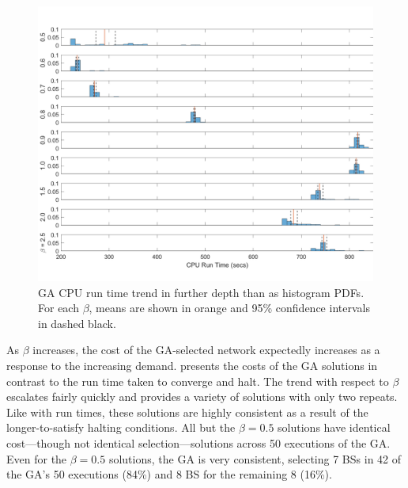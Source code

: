 \documentclass[12pt,dvipsnames]{report}
\begin{document}
\begin{figure}[p]
	\centering
	\includegraphics[angle=90,origin=c,height=0.8\textheight]{Figures/CaseI_GARunTime50_9HistogramsTall}
	\caption[Case I GA CPU run time histogram PDFs]{GA CPU run time trend in further depth than  as histogram PDFs.  For each $\beta$, means are shown in orange and 95\% confidence intervals in dashed black.}
	\label{fig:CaseI_GARunTimeHists}
\end{figure}

%
As $\beta$ increases, the cost of the GA-selected network expectedly increases as a response to the increasing demand.   presents the costs of the GA solutions in contrast to the run time taken to converge and halt.  The trend with respect to $\beta$ escalates fairly quickly and provides a variety of solutions with only two repeats.  Like with run times, these solutions are highly consistent as a result of the longer-to-satisfy halting conditions.  All but the $\beta = 0.5$ solutions have identical cost---though not identical selection---solutions across 50 executions of the GA.  Even for the $\beta = 0.5$ solutions, the GA is very consistent, selecting 7 BSs in 42 of the GA's 50 executions (84\%) and 8 BS for the remaining 8 (16\%).
\end{document}
